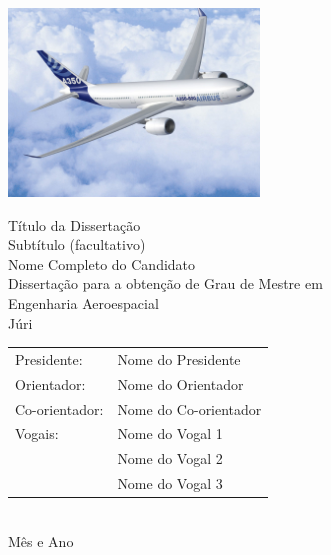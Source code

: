 \begin{center}
%
\vspace{1cm}
\includegraphics[height=50mm]{Figures/Airbus_A350.jpg}

\vspace{0.8cm}
{\FontLb Título da Dissertação} \\
\vspace{0.2cm}
{\FontMn Subtítulo (facultativo)} \\
\vspace{1.9cm}
{\FontMb Nome Completo do Candidato} \\
\vspace{1.9cm}
{\FontLn Disserta\c{c}\~{a}o para a obten\c{c}\~{a}o de Grau de Mestre em} \\
\vspace{0.3cm}
{\FontLb Engenharia Aeroespacial} \\
\vspace{1.9cm}
{\FontMb J\'{u}ri} \\
\vspace{0.3cm}
{\FontSn %
\begin{tabular}{ll}
Presidente: & Nome do Presidente \\
Orientador: & Nome do Orientador \\
Co-orientador: & Nome do Co-orientador \\
Vogais: & Nome do Vogal 1 \\
        & Nome do Vogal 2 \\
        & Nome do Vogal 3 \\
\end{tabular} } \\
\vspace{1.1cm}
{\FontMb M\^{e}s e Ano} \\
%
\end{center}

\cleardoublepage

